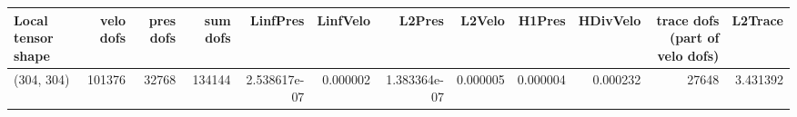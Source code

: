 \begin{tabular}{lrrrrrrrrrrr}
\toprule
Local tensor shape &  velo dofs &  pres dofs &  sum dofs &     LinfPres &  LinfVelo &       L2Pres &   L2Velo &   H1Pres &  HDivVelo &  trace dofs (part of velo dofs) &  L2Trace \\
\midrule
        (304, 304) &     101376 &      32768 &    134144 & 2.538617e-07 &  0.000002 & 1.383364e-07 & 0.000005 & 0.000004 &  0.000232 &                           27648 & 3.431392 \\
\bottomrule
\end{tabular}
